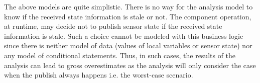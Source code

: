The above models are quite simplistic. There is no way for the analysis model to know if the received state information is stale or not. The component operation, at runtime, may decide not to publish sensor state if the received state information is stale. Such a choice cannot be modeled with this business logic since there is neither model of data (values of local variables or sensor state) nor any model of conditional statements. Thus, in such cases, the results of the analysis can lead to gross overestimates as the analysis will only consider the case when the publish always happens i.e. the worst-case scenario. 


  

